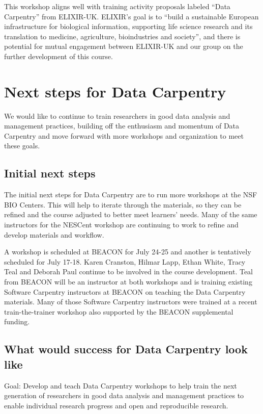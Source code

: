 \documentclass[11pt]{article}
\begin{document}
This workshop aligns well with training activity proposals labeled ``Data Carpentry'' from ELIXIR-UK. ELIXIR's goal is to ``build a sustainable European infrastructure for biological information, supporting life science research and its translation to medicine, agriculture, bioindustries and society'', and there is potential for mutual engagement between ELIXIR-UK and our group on the further development of this course.

\section{Next steps for Data Carpentry}

We would like to continue to train researchers in good data analysis and management practices, building off the enthusiasm and momentum of Data Carpentry and move forward with more workshops and organization to meet 
these goals.

\subsection{Initial next steps}

The initial next steps for Data Carpentry are to run more workshops at the NSF BIO Centers. This will help to 
iterate through the materials, so they can be refined and the course adjusted to better meet learners' needs. Many of the same instructors for the NESCent workshop are continuing to work to refine and develop materials and workflow.

A workshop is scheduled at BEACON for July 24-25 and another is tentatively scheduled for July 17-18. Karen Cranston, Hilmar Lapp, Ethan White, Tracy Teal and Deborah Paul continue to be involved in the course development. Teal from BEACON will be an instructor at both workshops and is training existing Software Carpentry instructors at BEACON on teaching the Data Carpentry materials. Many of those Software Carpentry instructors were trained at a recent train-the-trainer workshop also supported by the BEACON supplemental funding. 

\subsection{What would success for Data Carpentry look like}

\hangindent=0.7cm Goal: Develop and teach Data Carpentry workshops to help train the next generation of researchers in good data analysis and management practices to enable individual research progress and open and reproducible research. 
\end{document}
